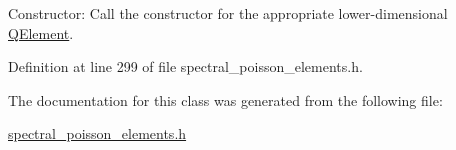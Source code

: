 Constructor\+: Call the constructor for the appropriate lower-\/dimensional \hyperlink{classoomph_1_1QElement}{Q\+Element}. 



Definition at line 299 of file spectral\+\_\+poisson\+\_\+elements.\+h.



The documentation for this class was generated from the following file\+:\begin{DoxyCompactItemize}
\item 
\hyperlink{spectral__poisson__elements_8h}{spectral\+\_\+poisson\+\_\+elements.\+h}\end{DoxyCompactItemize}
